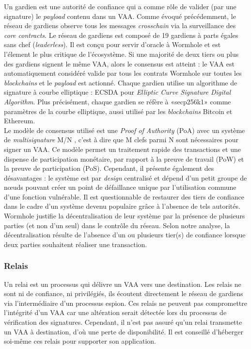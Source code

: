 Un gardien \cite{wormholeGuardian} est une autorité de confiance qui a comme rôle de valider 
(par une signature) le \textit{payload} contenu dans un VAA.
Comme évoqué précédemment, le réseau de gardiens observe tous les messages \textit{crosschain} via la 
surveillance des \textit{core contracts}.
Le réseau de gardiens est composé de 19 gardiens à parts égales sans chef (\textit{leaderless}).
Il est conçu pour servir d'oracle à \gls{Wormhole} et est l'élement le plus critique de l'écosystème.
Si une majorité de deux tiers ou plus des gardiens signent le même VAA, alors le consensus est atteint : 
le VAA est automatiquement considéré valide par  tous les contrats \gls{Wormhole} sur toutes les 
\textit{\gls{blockchain}s} et le \textit{payload} est actionné. 
Chaque gardien utilise un algorithme de signature à courbe elliptique : ECSDA pour 
\textit{Elliptic Curve Signature Digital Algorithm}.
Plus précisément, chaque gardien se réfère à «secp256k1» comme paramètres de la courbe elliptique, 
aussi utilisé par les \textit{\gls{blockchain}s} \gls{Bitcoin} et \gls{Ethereum}.\\
Le modèle de consensus utilisé est une \textit{Proof of Authority} (PoA) avec un système de 
\textit{multisignature} M/N \cite{wormholeChainswap}, c'est à dire que M clefs parmi N sont nécessaires 
pour signer un VAA. Ce modèle permet un traitement rapide des transactions et une dispense de participation monétaire, par rapport à la preuve de travail (PoW) et la preuve 
de participation (PoS). Cependant, il présente également des désavantages : le système est par 
\textit{design} centralisé et dépend d'un petit groupe de nœuds pouvant créer un point de 
défaillance unique par l'utilisation commune d'une fonction vulnérable. Il est questionnable de restaurer des tiers de confiance dans le cadre d'un système 
devenu populaire grâce à l'absence de tels autorités. \gls{Wormhole} justifie la décentralisation de leur 
système \cite{wormholeGuardian} par la présence de plusieurs parties (et non d'un seul) dans le contrôle du réseau.
Selon notre analyse, la décentralisation résulte de l'absence d'un ou plusieurs tier(s) de confiance lorsque deux parties 
souhaitent réaliser une transaction.

\subsubsection{Relais}

Un relai \cite{wormholeRelayer} est un processus qui délivre un VAA vers une destination.
Les relais ne sont ni de confiance, ni privilégiés, ils écoutent directement le réseau de gardiens 
via l'intermédiaire d'un processus espion. Ces relais ne peuvent pas compromettre l'intégrité d'un VAA 
car une altération serait détectée lors du processus de vérification des signatures. Cependant, il n'est 
pas assuré qu'un relai transmette un VAA à destination, d'où une perte de disponibilité. Il est conseillé
d'héberger soi-même ces relais pour supporter son application.

